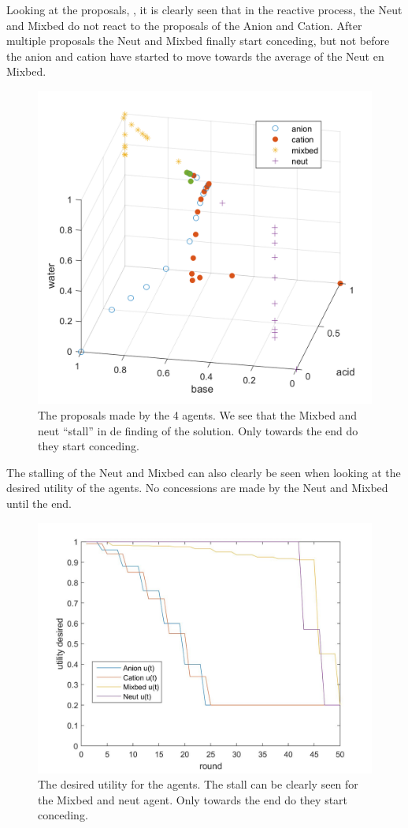 Looking at the proposals, , it is clearly seen that in the reactive process, the Neut and Mixbed do not react to the proposals of the Anion and Cation. After multiple proposals the Neut and Mixbed finally start conceding, but not before the anion and cation have started to move towards the average of the Neut en Mixbed. 

\begin{figure}[h]
	\centering
	\includegraphics[width=0.7\linewidth]{img/reactive_4_plot}
	\caption{The proposals made by the 4 agents. We see that the Mixbed and neut ``stall'' in de finding of the solution. Only towards the end do they start conceding.}
	\label{fig:reactive4plot}
\end{figure}

The stalling of the Neut and Mixbed can also clearly be seen when looking at the desired utility of the agents. No concessions are made by the Neut and Mixbed until the end.

\begin{figure}[h]
	\centering
	\includegraphics[width=0.7\linewidth]{img/desiredutility_reactive_4}
	\caption{The desired utility for the agents. The stall can be clearly seen for the Mixbed and neut agent. Only towards the end do they start conceding.}
	\label{fig:desiredutilityreactive4}
\end{figure}



